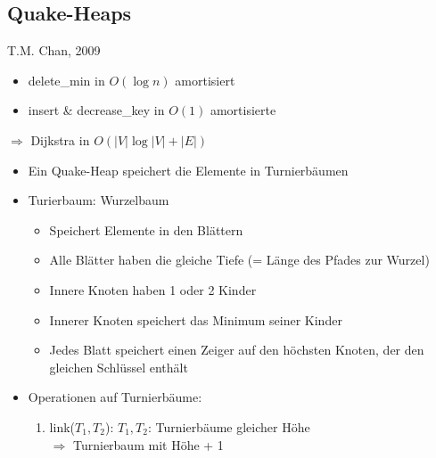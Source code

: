 \subsection{Quake-Heaps}
T.M. Chan, 2009
\begin{itemize}
 \item delete\_min in $O(\log n)$ amortisiert
 \item insert \& decrease\_key in $O(1)$ amortisierte
\end{itemize}
$\Rightarrow$ Dijkstra in $O(|V| \log |V| + |E|)$
\begin{itemize}
 \item Ein Quake-Heap speichert die Elemente in Turnierbäumen
 \item Turierbaum: Wurzelbaum
 \begin{itemize}
 \item Speichert Elemente in den Blättern
 \item Alle Blätter haben die gleiche Tiefe (= Länge des Pfades zur Wurzel)
 \item Innere Knoten haben 1 oder 2 Kinder
 \item Innerer Knoten speichert das Minimum seiner Kinder
 \item Jedes Blatt speichert einen Zeiger auf den höchsten Knoten, der den gleichen Schlüssel enthält 
 \end{itemize}
 \begin{center}
 \end{center}
 \item Operationen auf Turnierbäume:
 \begin{enumerate}
  \item link($T_1, T_2$): $T_1, T_2$: Turnierbäume gleicher Höhe \\
      $\Rightarrow$ Turnierbaum mit Höhe + 1
      \begin{center}     
       \begin{minipage}{3cm}
        \centering
\end{minipage}
\end{center}
\end{enumerate}
\end{itemize}
